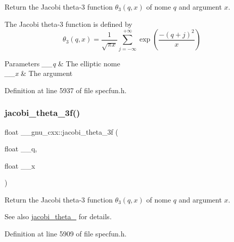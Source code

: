 Return the Jacobi theta-\/3 function $ \theta_3(q,x) $ of nome $ q $ and argument $ x $.

The Jacobi theta-\/3 function is defined by \[ \theta_3(q,x) = \frac{1}{\sqrt{\pi x}} \sum_{j=-\infty}^{+\infty} \exp\left( \frac{-(q+j)^2}{x} \right) \]


\begin{DoxyParams}{Parameters}
{\em \+\_\+\+\_\+q} & The elliptic nome \\
\hline
{\em \+\_\+\+\_\+x} & The argument \\
\hline
\end{DoxyParams}


Definition at line 5937 of file specfun.\+h.

\mbox{\label{group__gnu__math__spec__func_ga6ff9738978be029e90e1f144ab4aa165}} 
\subsubsection{\texorpdfstring{jacobi\+\_\+theta\+\_\+3f()}{jacobi\_theta\_3f()}}
{\footnotesize\ttfamily float \+\_\+\+\_\+gnu\+\_\+cxx\+::jacobi\+\_\+theta\+\_\+3f (\begin{DoxyParamCaption}\item[{float}]{\+\_\+\+\_\+q,  }\item[{float}]{\+\_\+\+\_\+x }\end{DoxyParamCaption})\hspace{0.3cm}{\ttfamily [inline]}}

Return the Jacobi theta-\/3 function $ \theta_3(q,x) $ of nome $ q $ and argument $ x $.

\begin{DoxySeeAlso}{See also}
\hyperlink{group__gnu__math__spec__func_gaf4eac2990db1dadba66ae688ceaa6403}{jacobi\+\_\+theta\+\_} for details. 
\end{DoxySeeAlso}


Definition at line 5909 of file specfun.\+h.

\mbox{\label{group__gnu__math__spec__func_ga313109bbf08d81e93196eb73c2047dd2}} 
